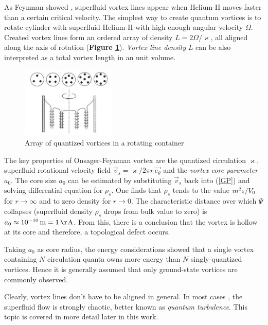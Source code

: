 As Feynman showed \cite{feynman}, superfluid vortex lines appear when Helium-II moves faster than a certain critical velocity. The simplest way to create quantum vortices is to rotate cylinder with superfluid Helium-II with high enough angular velocity $\Omega$. Created vortex lines form an ordered array of density $L=2\Omega / \varkappa$, all aligned along the axis of rotation (\textbf{Figure \ref{rotating-helium}}). \textit{Vortex line density} $L$ can be also interpreted as a total vortex length in an unit volume.

\begin{figure}[h]
	\centering
	\includegraphics[width=0.4\textwidth]{graphics/theory/rotating-helium}
	\caption{Array of quantized vortices in a rotating container}
	\label{rotating-helium}
\end{figure}

The key properties of Onsager-Feynman vortex \cite{onsager} are the quantized circulation $\varkappa$, superfluid rotational velocity field $\vec{v}_s = \varkappa / 2\pi r\, \vec{e_{\theta}}$ and the \textit{vortex core parameter} $a_0$. The core size $a_0$ can be estimated by substituting $\vec{v}_s$ back into (\ref{GP}) and solving differential equation for $\rho_s$. One finds that $\rho_s$ tends to the value $m^2 \varepsilon / V_0$ for $r \rightarrow \infty$ and to zero density for $r \rightarrow 0$.
The characteristic distance over which $\Psi$ collapses (superfluid density $\rho_s$ drops from bulk value to zero) is $a_0 \approx 10^{-10} \unit{m} = 1 \unit{\AA}$. From this, there is a conclusion that the vortex is hollow at its core and therefore, a topological defect occurs.

Taking $a_0$ as core radius, the energy considerations showed that a single vortex containing $N$ circulation quanta owns more energy than $N$ singly-quantized vortices. Hence it is generally assumed that only ground-state vortices are commonly observed.

Clearly, vortex lines don't have to be aligned in general. In most cases , the superfluid flow is strongly chaotic, better known as \textit{quantum turbulence}. This topic is covered in more detail later in this work.

